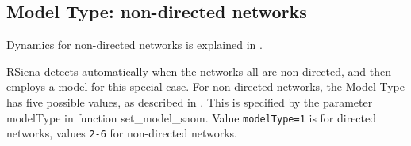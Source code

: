 \documentclass[a4paper,fleqn,11pt]{article}
\newcommand{\+}{\, + \,}
\newcommand{\sfn}[1]{\textsf{#1}}
\newcommand{\RS}{{\sf \textsf{RSiena} }}
\begin{document}

\subsection{Model Type: non-directed networks}
\label{S_modeltype_nd}

Dynamics for non-directed networks is explained in \citet{SnijdersPickup17}.

\RS detects automatically when the networks all are non-directed,
and then employs a model for this special case.
For non-directed networks, the Model Type has five possible values,
as described in \citet{SnijdersPickup17}.
This is specified by the parameter \sfn{modelType} in function
\textsf{set\_model\_saom}.
Value \texttt{modelType=1} is for directed networks, values
\texttt{2-6} for non-directed networks.

\end{document}
